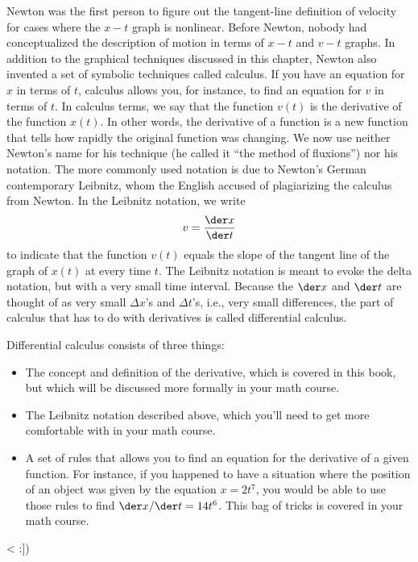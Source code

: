 Newton was the first person to figure out the tangent-line
definition of velocity for cases where the $x-t$ graph is
nonlinear. Before Newton, nobody had conceptualized the
description of motion in terms of $x-t$ and $v-t$ graphs. In
addition to the graphical techniques discussed in this
chapter, Newton also invented a set of symbolic techniques
called calculus. If you have an equation for $x$ in terms of
$t$, calculus allows you, for instance, to find an equation
for $v$ in terms of $t$. In calculus terms, we say that the
function $v(t)$ is the derivative of the function $x(t)$. In
other words, the derivative of a function is a new function
that tells how rapidly the original function was changing.
We now use neither Newton's name for his technique (he
called it ``the method of fluxions'') nor his notation. The
more commonly used notation is due to Newton's German
contemporary Leibnitz, whom the English accused of
plagiarizing the calculus from Newton. In the Leibnitz notation, we write
\begin{equation*}
  v = \frac{\der x}{\der t}
\end{equation*}
to indicate that the function $v(t)$ equals the slope of the
tangent line of the graph of $x(t)$ at every time $t$. The
Leibnitz notation is meant to evoke the delta notation, but
with a very small time interval. Because the $\der x$ and
$\der t$ are thought of as very small $\Delta x$'s and
$\Delta t$'s, i.e., very small differences, the part of
calculus that has to do with derivatives is called
differential calculus.

Differential calculus
consists of three things:

\begin{itemize}

\item  The concept and definition of the derivative,
which is covered in this book, but which will be discussed
more formally in your math course.

\item  The Leibnitz
notation described above, which you'll need to get more
comfortable with in your math course.

\item  A set of rules that allows you to find an equation for
the derivative of a given function. For instance, if you
happened to have a situation where the position of an object
was given by the equation $x=2t^7$, you would be able to use
those rules to find $\der x/\der t=14t^6$. This bag of
tricks is covered in your math course.

\end{itemize}

<%
:])
